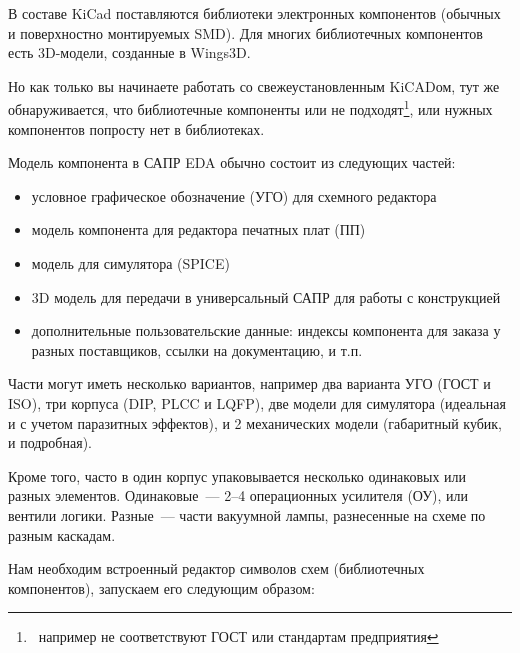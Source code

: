 \secdown

\bigskip

В составе KiCad поставляются библиотеки электронных компонентов (обычных и
поверхностно монтируемых SMD). Для многих библиотечных компонентов есть
3D-модели, созданные в Wings3D.

Но как только вы начинаете работать со свежеустановленным KiCADом, тут же
обнаруживается, что библиотечные компоненты или не подходят\footnote{\
например не соответствуют ГОСТ или стандартам предприятия}, или нужных
компонентов попросту нет в библиотеках.

Модель компонента в САПР EDA обычно состоит из следующих частей:

\begin{itemize}
  \item условное графическое обозначение (УГО) для схемного редактора
  \item модель компонента для редактора печатных плат (ПП)
  \item модель для симулятора (SPICE)
  \item 3D модель для передачи в универсальный САПР для работы с конструкцией
  \item дополнительные пользовательские данные: индексы компонента для
  заказа у разных поставщиков, ссылки на документацию, и т.п.
\end{itemize}

Части могут иметь несколько вариантов, например два варианта УГО (ГОСТ и ISO),
три корпуса (DIP, PLCC и LQFP), две модели для симулятора (идеальная и с
учетом паразитных эффектов), и 2 механических модели (габаритный кубик, и
подробная).

Кроме того, часто в один корпус упаковывается несколько одинаковых или разных
элементов. Одинаковые\ --- 2--4 операционных усилителя (ОУ), или вентили
логики. Разные\ --- части вакуумной лампы, разнесенные на схеме по разным
каскадам.


Нам необходим встроенный редактор символов схем (библиотечных компонентов),
запускаем его следующим образом:

